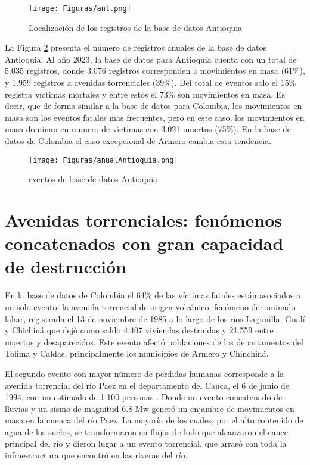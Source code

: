 \documentclass{article}
\begin{document}
\begin{figure}[ht!]
    \centering
      {\texttt{[image: Figuras/ant.png]}}
    \caption{Localización de los registros de la base de datos Antioquia}
    \label{fig:LocAnt}
\end{figure}

La Figura \ref{fig:AnualAnt} presenta el número de registros anuales de la base de datos Antioquia. Al año 2023, la base de datos para Antioquia cuenta con un total de 5.035 registros, donde 3.076 registros corresponden a movimientos en masa (61\%), y 1.959 registros a avenidas torrenciales  (39\%). Del total de eventos solo el 15\% registra víctimas mortales y entre estos el 73\% son movimientos en masa. Es decir, que de forma similar a la base de datos para Colombia, los movimientos en masa son los eventos fatales mas frecuentes, pero en este caso, los movimientos en masa dominan en numero de víctimas con 3.021 muertos (75\%). En la base de datos de Colombia el caso excepcional de Armero cambia esta tendencia.

\begin{figure}[ht!]
    \centering
      {\texttt{[image: Figuras/anualAntioquia.png]}}
    \caption{eventos de base de datos Antioquia}
    \label{fig:AnualAnt}
\end{figure}

\section{Avenidas torrenciales: fenómenos concatenados con gran capacidad de destrucción}
En la base de datos de Colombia el 64\% de las víctimas fatales están asociados a un solo evento: la avenida torrencial de origen volcánico, fenómeno denominado lahar, registrada el 13 de noviembre de 1985 a lo largo de los ríos Lagunilla, Gualí y Chichiná que dejó como saldo 4.407 viviendas destruidas y 21.559 entre muertos y desaparecidos. Este evento afectó poblaciones de los departamentos del Tolima y Caldas, principalmente los municipios de Armero y Chinchiná.

El segundo evento con mayor número de pérdidas humanas corresponde a la avenida torrencial del río Paez en el departamento del Cauca, el 6 de junio de 1994, con un estimado de 1.100 personas \cite{hermelin2005desastres}. Donde un evento concatenado de lluvias y un sismo de magnitud 6.8 Mw generó un enjambre de movimientos en masa en la cuenca del río Paez. La mayoría de los cuales, por el alto contenido de agua de los suelos, se transformaron en flujos de lodo que alcanzaron el cauce principal del río y dieron lugar a un evento torrencial, que arrasó con toda la infraestructura que encontró en las riveras del río.
\end{document}
